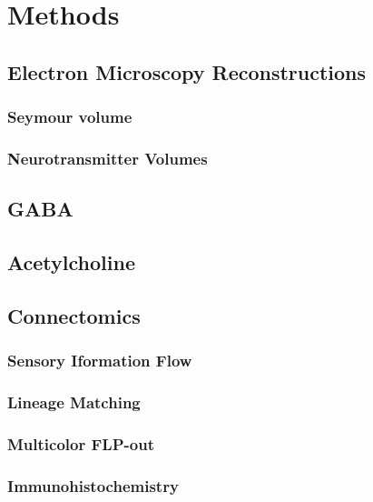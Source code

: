 
\chapter{Methods}

\ifpdf
    \graphicspath{{Chapter2/Figs/Raster/}{Chapter2/Figs/PDF/}{Chapter2/Figs/}}
\else
    \graphicspath{{Chapter2/Figs/Vector/}{Chapter2/Figs/}}
\fi


\section{Electron Microscopy Reconstructions}
\subsection{Seymour volume}
\subsection{Neurotransmitter Volumes}
\section*{GABA}
\section*{Acetylcholine}

\section{Connectomics}
\subsection{Sensory Iformation Flow}
\subsection{Lineage Matching}


\subsection{Multicolor FLP-out}
\subsection{Immunohistochemistry}
